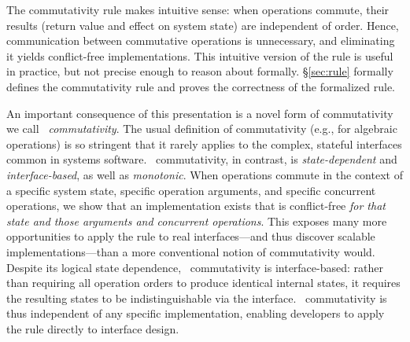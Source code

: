 The commutativity rule makes
intuitive sense: when operations commute, their
results (return value and effect on system state) are independent of order.
Hence, communication between commutative operations is
unnecessary, and eliminating it yields conflict-free implementations.
%
This intuitive version of the rule is useful in practice, but
not precise enough to reason
about formally.
%
\S\ref{sec:rule} formally defines the commutativity rule and proves
the correctness of the formalized rule.

An important consequence of this presentation is a novel form of
commutativity we call \emph{\SRI\ commutativity}.
%
The usual definition of commutativity (e.g., for algebraic operations)
is so stringent that it rarely applies to the complex, stateful
interfaces common in systems software.
%
\SRI\ commutativity, in contrast, is \emph{state-dependent} and
\emph{interface-based}, as well as \emph{monotonic}.
%
%
When operations commute in the context of a specific system state,
specific operation arguments, and specific concurrent operations, we
show that an implementation exists that is conflict-free \emph{for that state
  and those arguments and concurrent operations}.
%
This exposes many more opportunities to apply the rule to real
interfaces---and thus discover scalable implementations---than a more
conventional notion of commutativity would.
%
Despite its logical state dependence, \SRI\ commutativity is
interface-based: rather than requiring all operation orders to produce
identical internal states, it requires the resulting states to be
indistinguishable via the interface.
%
\SRI\ commutativity is thus independent of any specific
implementation, enabling developers to apply the rule directly to
interface design.



